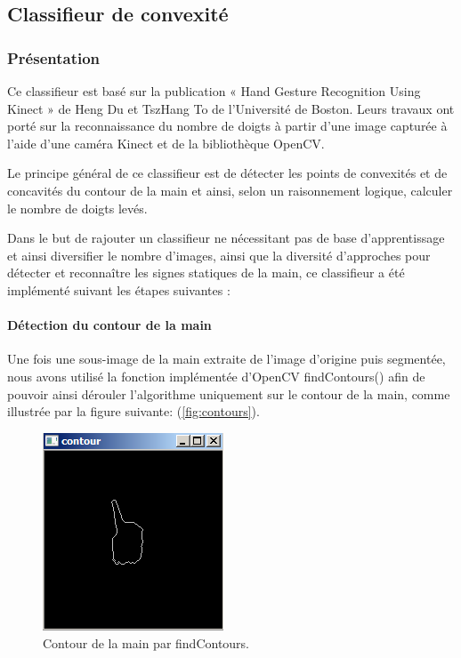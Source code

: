 \subsection{Classifieur de convexité}
\subsubsection{Présentation}

Ce classifieur est basé sur la publication « Hand Gesture Recognition Using Kinect » de Heng Du et TszHang To de l’Université de Boston.  Leurs travaux ont porté sur la reconnaissance du nombre de doigts à partir d’une image capturée à l’aide d’une caméra Kinect et de la bibliothèque OpenCV. 

Le principe général de ce classifieur est de détecter les points de convexités et de concavités du contour de la main et ainsi, selon un raisonnement logique, calculer le nombre de doigts levés.

Dans le but de rajouter un classifieur ne nécessitant pas de base d’apprentissage et ainsi diversifier le nombre d’images, ainsi que la diversité d’approches pour détecter et reconnaître les signes statiques de la main, ce classifieur a été implémenté suivant les étapes suivantes :

\paragraph{Détection du contour de la main}
Une fois une sous-image de la main extraite de l’image d’origine puis segmentée, nous avons utilisé la fonction implémentée d’OpenCV findContours() afin de pouvoir ainsi dérouler l’algorithme uniquement sur le contour de la main, comme illustrée par la figure suivante:  (\autoref{fig:contours}).

\begin{figure}[htb!]
\centerline{\includegraphics{contours.png}}
\caption{Contour de la main par findContours.}
\label{fig:contours}
\end{figure}

